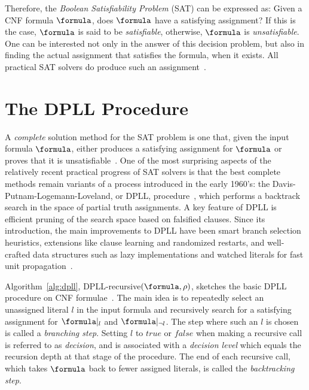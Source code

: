 Therefore, the \emph{Boolean Satisfiability Problem} (SAT) can be expressed as:
Given a CNF formula $\formula$, does $\formula$ have a satisfying assignment? If
this is the case, $\formula$ is said to be \emph{satisfiable}, otherwise,
$\formula$ is \emph{unsatisfiable}.  One can be interested not only in the
answer of this decision problem, but also in finding the actual assignment that
satisfies the formula, when it exists. All practical SAT solvers do produce such
an assignment~\cite{cormen}. 

\section{The DPLL Procedure}%
\label{sec:dpll}

A \emph{complete} solution method for the SAT problem is one that, given the
input formula $\formula$, either produces a satisfying assignment for $\formula$
or proves that it is unsatisfiable~\cite{satchapter}. One of the most surprising
aspects of the relatively recent practical progress of SAT solvers is that the
best complete methods remain variants of a process introduced in the early
1960’s: the Davis-Putnam-Logemann-Loveland, or DPLL,
procedure~\cite{DavisLongemannLoveland:1962}, which performs a backtrack search
in the space of partial truth assignments. A key feature of DPLL is efficient
pruning of the search space based on falsified clauses. Since its introduction,
the main improvements to DPLL have been smart branch selection heuristics,
extensions like clause learning and randomized restarts, and well-crafted data
structures such as lazy implementations and watched literals for fast unit
propagation~\cite{satchapter}.

Algorithm~\ref{alg:dpll}, DPLL-recursive$(\formula, \rho)$, sketches the basic
DPLL procedure on CNF formulae~\cite{DavisLongemannLoveland:1962}. The main idea
is to repeatedly select an unassigned literal $l$ in the input formula and
recursively search for a satisfying assignment for $\formula|_l$ and
$\formula|_{\neg l}$. The step where such an $l$ is chosen is called a
\emph{branching step}. Setting $l$ to $true$ or $false$ when making a recursive call
is referred to as \emph{decision}, and is associated with a \emph{decision
level} which equals the recursion depth at that stage of the procedure. The end
of each recursive call, which takes $\formula$ back to fewer assigned literals,
is called the \emph{backtracking step}.

